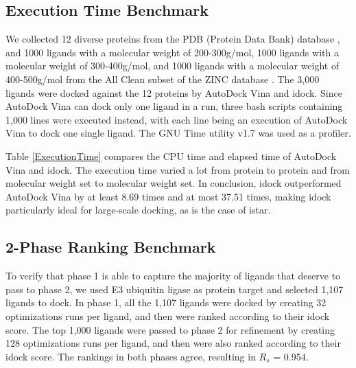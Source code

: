\documentclass[10pt]{article}
\begin{document}
\subsection*{Execution Time Benchmark}
We collected 12 diverse proteins from the PDB (Protein Data Bank) database \cite{540,537}, and 1000 ligands with a molecular weight of 200-300g/mol, 1000 ligands with a molecular weight of 300-400g/mol, and 1000 ligands with a molecular weight of 400-500g/mol from the All Clean subset of the ZINC database \cite{532,1178}. The 3,000 ligands were docked against the 12 proteins by AutoDock Vina and idock. Since AutoDock Vina can dock only one ligand in a run, three bash scripts containing 1,000 lines were executed instead, with each line being an execution of AutoDock Vina to dock one single ligand. The GNU Time utility v1.7 was used as a profiler.

Table \ref{ExecutionTime} compares the CPU time and elapsed time of AutoDock Vina and idock. The execution time varied a lot from protein to protein and from molecular weight set to molecular weight set. In conclusion, idock outperformed AutoDock Vina by at least 8.69 times and at most 37.51 times, making idock particularly ideal for large-scale docking, as is the case of istar.

\subsection*{2-Phase Ranking Benchmark}
To verify that phase 1 is able to capture the majority of ligands that deserve to pass to phase 2, we used E3 ubiquitin ligase as protein target and selected 1,107 ligands to dock. In phase 1, all the 1,107 ligands were docked by creating 32 optimizations runs per ligand, and then were ranked according to their idock score. The top 1,000 ligands were passed to phase 2 for refinement by creating 128 optimizations runs per ligand, and then were also ranked according to their idock score. The rankings in both phases agree, resulting in $R_s$ = 0.954.
\end{document}
